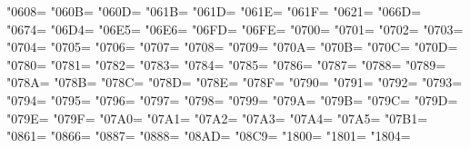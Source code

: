 \XeTeXcharclass"0608=\KclassArabU
\XeTeXcharclass"060B=\KclassArabU
\XeTeXcharclass"060D=\KclassArabU
\XeTeXcharclass"061B=\KclassArabU
\XeTeXcharclass"061D=\KclassArabU
\XeTeXcharclass"061E=\KclassArabU
\XeTeXcharclass"061F=\KclassArabU
\XeTeXcharclass"0621=\KclassArabU
\XeTeXcharclass"066D=\KclassArabU
\XeTeXcharclass"0674=\KclassArabU
\XeTeXcharclass"06D4=\KclassArabU
\XeTeXcharclass"06E5=\KclassArabU
\XeTeXcharclass"06E6=\KclassArabU
\XeTeXcharclass"06FD=\KclassArabU
\XeTeXcharclass"06FE=\KclassArabU
\XeTeXcharclass"0700=\KclassArabU
\XeTeXcharclass"0701=\KclassArabU
\XeTeXcharclass"0702=\KclassArabU
\XeTeXcharclass"0703=\KclassArabU
\XeTeXcharclass"0704=\KclassArabU
\XeTeXcharclass"0705=\KclassArabU
\XeTeXcharclass"0706=\KclassArabU
\XeTeXcharclass"0707=\KclassArabU
\XeTeXcharclass"0708=\KclassArabU
\XeTeXcharclass"0709=\KclassArabU
\XeTeXcharclass"070A=\KclassArabU
\XeTeXcharclass"070B=\KclassArabU
\XeTeXcharclass"070C=\KclassArabU
\XeTeXcharclass"070D=\KclassArabU
\XeTeXcharclass"0780=\KclassArabU
\XeTeXcharclass"0781=\KclassArabU
\XeTeXcharclass"0782=\KclassArabU
\XeTeXcharclass"0783=\KclassArabU
\XeTeXcharclass"0784=\KclassArabU
\XeTeXcharclass"0785=\KclassArabU
\XeTeXcharclass"0786=\KclassArabU
\XeTeXcharclass"0787=\KclassArabU
\XeTeXcharclass"0788=\KclassArabU
\XeTeXcharclass"0789=\KclassArabU
\XeTeXcharclass"078A=\KclassArabU
\XeTeXcharclass"078B=\KclassArabU
\XeTeXcharclass"078C=\KclassArabU
\XeTeXcharclass"078D=\KclassArabU
\XeTeXcharclass"078E=\KclassArabU
\XeTeXcharclass"078F=\KclassArabU
\XeTeXcharclass"0790=\KclassArabU
\XeTeXcharclass"0791=\KclassArabU
\XeTeXcharclass"0792=\KclassArabU
\XeTeXcharclass"0793=\KclassArabU
\XeTeXcharclass"0794=\KclassArabU
\XeTeXcharclass"0795=\KclassArabU
\XeTeXcharclass"0796=\KclassArabU
\XeTeXcharclass"0797=\KclassArabU
\XeTeXcharclass"0798=\KclassArabU
\XeTeXcharclass"0799=\KclassArabU
\XeTeXcharclass"079A=\KclassArabU
\XeTeXcharclass"079B=\KclassArabU
\XeTeXcharclass"079C=\KclassArabU
\XeTeXcharclass"079D=\KclassArabU
\XeTeXcharclass"079E=\KclassArabU
\XeTeXcharclass"079F=\KclassArabU
\XeTeXcharclass"07A0=\KclassArabU
\XeTeXcharclass"07A1=\KclassArabU
\XeTeXcharclass"07A2=\KclassArabU
\XeTeXcharclass"07A3=\KclassArabU
\XeTeXcharclass"07A4=\KclassArabU
\XeTeXcharclass"07A5=\KclassArabU
\XeTeXcharclass"07B1=\KclassArabU
\XeTeXcharclass"0861=\KclassArabU
\XeTeXcharclass"0866=\KclassArabU
\XeTeXcharclass"0887=\KclassArabU
\XeTeXcharclass"0888=\KclassArabU
\XeTeXcharclass"08AD=\KclassArabU
\XeTeXcharclass"08C9=\KclassArabU
\XeTeXcharclass"1800=\KclassArabU
\XeTeXcharclass"1801=\KclassArabU
\XeTeXcharclass"1804=\KclassArabU
